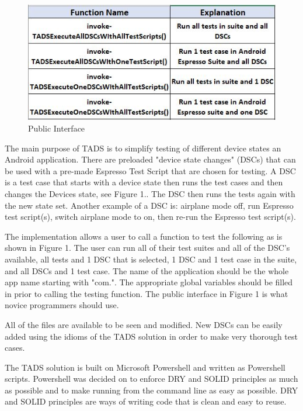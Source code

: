 \begin{figure}[h]
	\centering
	\caption[Public Interface]{Public Interface}
	\label{fig:table2}
	\includegraphics[width=1\linewidth]{table2}
\end{figure}

The main purpose of TADS is to simplify testing of different device states an Android application.  There are preloaded "device state changes" (DSCs) that can be used with a pre-made Espresso Test Script that are chosen for testing.  A DSC is a test case that starts with a device state then runs the test cases and then changes the Devices state, see Figure 1..  The DSC then runs the tests again with the new state set.  Another example of a DSC is: airplane mode off, run Espresso test script(s), switch airplane mode to on, then re-run the Espresso test script(s).

The implementation allows a user to call a function to test the following as is shown in Figure 1.  The user can run all of their test suites and all of the DSC's available, all tests and 1 DSC that is selected, 1 DSC and 1 test case in the suite, and all DSCs and 1 test case. The name of the application should be the whole app name starting with "com.".  The appropriate global variables should be filled in prior to calling the testing function. The public interface in Figure 1 is what novice programmers should use.

All of the files are available to be seen and modified.  New DSCs can be easily added using the idioms of the TADS solution in order to make very thorough test cases.

The TADS solution is built on Microsoft Powershell and written as Powershell scripts.  Powershell was decided on to enforce DRY and SOLID principles as much as possible and to make running from the command line as easy as possible.  DRY and SOLID principles are ways of writing code that is clean and easy to reuse.  

